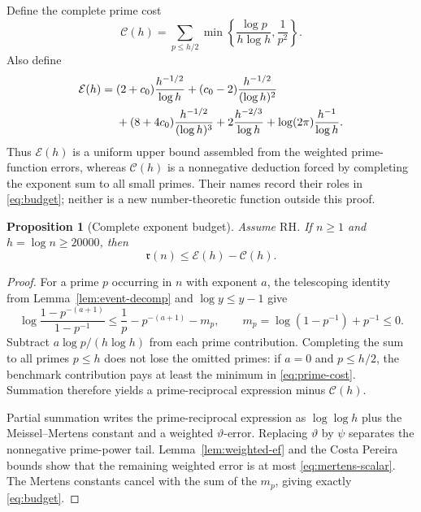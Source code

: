 \documentclass[11pt]{amsart}
\newtheorem{proposition}[theorem]{Proposition}
\theoremstyle{definition}
\theoremstyle{remark}
\numberwithin{equation}{section}
\newcommand{\RH}{\mathrm{RH}}
\newcommand{\M}{\mathfrak r}
\newcommand{\E}{\mathcal{E}}
\newcommand{\Pcost}{\mathcal{C}}
\begin{document}
Define the complete prime cost
\begin{equation}\label{eq:prime-cost}
  \Pcost(h)=\sum_{p\le h/2}
  \min\!\left\{\frac{\log p}{h\log h},\frac1{p^2}\right\}.
\end{equation}
Also define
\begin{align}
  \E(h)={}&(2+c_0)\frac{h^{-1/2}}{\log h}
  +(c_0-2)\frac{h^{-1/2}}{(\log h)^2}\notag\\
  &+(8+4c_0)\frac{h^{-1/2}}{(\log h)^3}
  +2\frac{h^{-2/3}}{\log h}
  +\log(2\pi)\frac{h^{-1}}{\log h}.
  \label{eq:mertens-scalar}
\end{align}
Thus $\E(h)$ is a uniform upper bound assembled from the weighted
prime-function errors, whereas $\Pcost(h)$ is a nonnegative deduction forced
by completing the exponent sum to all small primes.  Their names record
their roles in \eqref{eq:budget}; neither is a new number-theoretic function
outside this proof.

\begin{proposition}[Complete exponent budget]\label{prop:budget}
Assume $\RH$.  If $n\ge1$ and $h=\log n\ge20000$, then
\begin{equation}\label{eq:budget}
  \M(n)\le \E(h)-\Pcost(h).
\end{equation}
\end{proposition}

\begin{proof}
For a prime $p$ occurring in $n$ with exponent $a$, the telescoping identity
from Lemma~\ref{lem:event-decomp} and $\log y\le y-1$ give
\begin{equation}\label{eq:prime-gain}
 \log\frac{1-p^{-(a+1)}}{1-p^{-1}}
 \le \frac1p-p^{-(a+1)}-m_p,
 \qquad
 m_p=\log(1-p^{-1})+p^{-1}\le0.
\end{equation}
Subtract $a\log p/(h\log h)$ from each prime contribution.  Completing the
sum to all primes $p\le h$ does not lose the omitted primes: if $a=0$ and
$p\le h/2$, the benchmark contribution pays at least the minimum in
\eqref{eq:prime-cost}.  Summation therefore yields a prime-reciprocal
expression minus $\Pcost(h)$.

Partial summation writes the prime-reciprocal expression as
$\log\log h$ plus the Meissel--Mertens constant and a weighted
$\vartheta$-error.
Replacing $\vartheta$ by $\psi$ separates the nonnegative prime-power tail.
Lemma~\ref{lem:weighted-ef} and the Costa Pereira bounds show that the
remaining weighted error is at most \eqref{eq:mertens-scalar}.  The Mertens
constants cancel with the sum of the $m_p$, giving exactly
\eqref{eq:budget}.
\end{proof}
\end{document}
